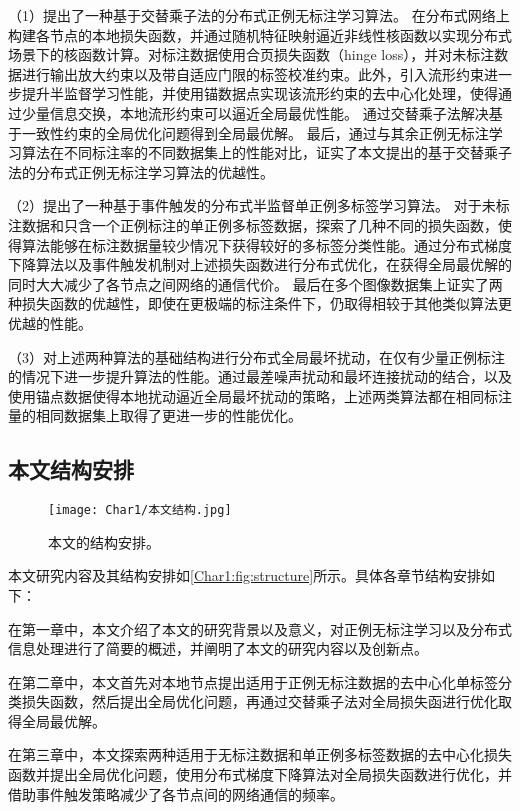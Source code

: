 （1）提出了一种基于交替乘子法的分布式正例无标注学习算法。
在分布式网络上构建各节点的本地损失函数，并通过随机特征映射逼近非线性核函数以实现分布式场景下的核函数计算。对标注数据使用合页损失函数（hinge loss），并对未标注数据进行输出放大约束以及带自适应门限的标签校准约束。此外，引入流形约束进一步提升半监督学习性能，并使用锚数据点实现该流形约束的去中心化处理，使得通过少量信息交换，本地流形约束可以逼近全局最优性能。
通过交替乘子法解决基于一致性约束的全局优化问题得到全局最优解。
最后，通过与其余正例无标注学习算法在不同标注率的不同数据集上的性能对比，证实了本文提出的基于交替乘子法的分布式正例无标注学习算法的优越性。

（2）提出了一种基于事件触发的分布式半监督单正例多标签学习算法。
对于未标注数据和只含一个正例标注的单正例多标签数据，探索了几种不同的损失函数，使得算法能够在标注数据量较少情况下获得较好的多标签分类性能。通过分布式梯度下降算法以及事件触发机制对上述损失函数进行分布式优化，在获得全局最优解的同时大大减少了各节点之间网络的通信代价。
最后在多个图像数据集上证实了两种损失函数的优越性，即使在更极端的标注条件下，仍取得相较于其他类似算法更优越的性能。

（3）对上述两种算法的基础结构进行分布式全局最坏扰动，在仅有少量正例标注的情况下进一步提升算法的性能。通过最差噪声扰动和最坏连接扰动的结合，以及使用锚点数据使得本地扰动逼近全局最坏扰动的策略，上述两类算法都在相同标注量的相同数据集上取得了更进一步的性能优化。

\subsection{本文结构安排}
\begin{figure}[htbp]
    \centering
    \texttt{[image: Char1/本文结构.jpg]}
    \caption{\label{Char1:fig:structure}本文的结构安排。}
\end{figure}
本文研究内容及其结构安排如\autoref{Char1:fig:structure}所示。具体各章节结构安排如下：

在第一章中，本文介绍了本文的研究背景以及意义，对正例无标注学习以及分布式信息处理进行了简要的概述，并阐明了本文的研究内容以及创新点。

在第二章中，本文首先对本地节点提出适用于正例无标注数据的去中心化单标签分类损失函数，然后提出全局优化问题，再通过交替乘子法对全局损失函进行优化取得全局最优解。

在第三章中，本文探索两种适用于无标注数据和单正例多标签数据的去中心化损失函数并提出全局优化问题，使用分布式梯度下降算法对全局损失函数进行优化，并借助事件触发策略减少了各节点间的网络通信的频率。

